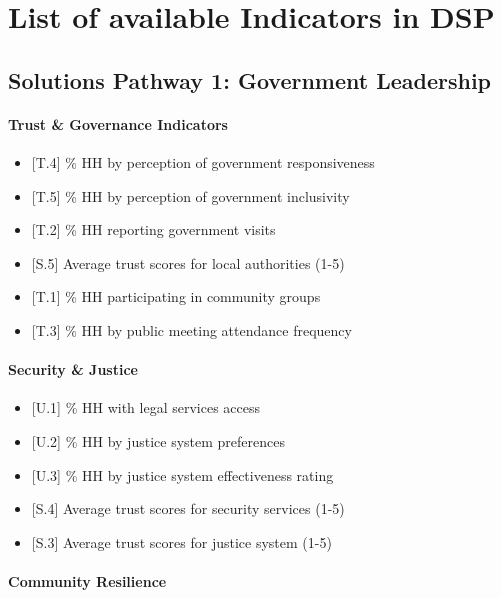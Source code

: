 \documentclass[
]{report}
\providecommand{\tightlist}{%
  \setlength{\itemsep}{0pt}\setlength{\parskip}{0pt}}
\begin{document}
\section{List of available Indicators in
DSP}\label{list-of-available-indicators-in-dsp}

\subsection{Solutions Pathway 1: Government
Leadership}\label{solutions-pathway-1-government-leadership}

\paragraph{Trust \& Governance
Indicators}\label{trust-governance-indicators}

\begin{itemize}
\tightlist
\item
  {[}T.4{]} \% HH by perception of government responsiveness
\item
  {[}T.5{]} \% HH by perception of government inclusivity
\item
  {[}T.2{]} \% HH reporting government visits
\item
  {[}S.5{]} Average trust scores for local authorities (1-5)
\item
  {[}T.1{]} \% HH participating in community groups
\item
  {[}T.3{]} \% HH by public meeting attendance frequency
\end{itemize}

\paragraph{Security \& Justice}\label{security-justice}

\begin{itemize}
\tightlist
\item
  {[}U.1{]} \% HH with legal services access
\item
  {[}U.2{]} \% HH by justice system preferences
\item
  {[}U.3{]} \% HH by justice system effectiveness rating
\item
  {[}S.4{]} Average trust scores for security services (1-5)
\item
  {[}S.3{]} Average trust scores for justice system (1-5)
\end{itemize}

\paragraph{Community Resilience}\label{community-resilience}
\end{document}

